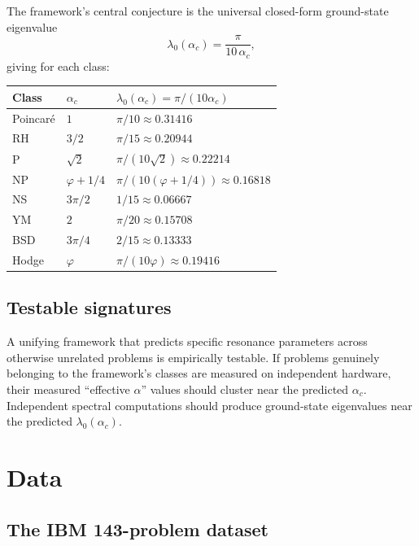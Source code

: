 \documentclass[11pt,a4paper]{article}
\theoremstyle{definition}
\begin{document}
The framework's central conjecture is the universal closed-form
ground-state eigenvalue
\[
\lambda_0(\alpha_c) = \frac{\pi}{10\,\alpha_c},
\]
giving for each class:
\begin{center}
\begin{tabular}{lll}
\toprule
Class & $\alpha_c$ & $\lambda_0(\alpha_c) = \pi/(10\alpha_c)$ \\
\midrule
Poincar\'e & $1$ & $\pi/10 \approx 0.31416$ \\
RH & $3/2$ & $\pi/15 \approx 0.20944$ \\
P & $\sqrt{2}$ & $\pi/(10\sqrt{2}) \approx 0.22214$ \\
NP & $\varphi + 1/4$ & $\pi/(10(\varphi+1/4)) \approx 0.16818$ \\
NS & $3\pi/2$ & $1/15 \approx 0.06667$ \\
YM & $2$ & $\pi/20 \approx 0.15708$ \\
BSD & $3\pi/4$ & $2/15 \approx 0.13333$ \\
Hodge & $\varphi$ & $\pi/(10\varphi) \approx 0.19416$ \\
\bottomrule
\end{tabular}
\end{center}

\subsection{Testable signatures}

A unifying framework that predicts specific resonance parameters across
otherwise unrelated problems is empirically testable. If problems
genuinely belonging to the framework's classes are measured on
independent hardware, their measured ``effective $\alpha$'' values
should cluster near the predicted $\alpha_c$. Independent spectral
computations should produce ground-state eigenvalues near the predicted
$\lambda_0(\alpha_c)$.

\section{Data}

\subsection{The IBM 143-problem dataset}
\end{document}
